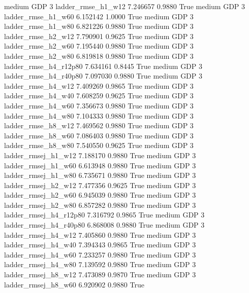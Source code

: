     medium      GDP                 3     ladder_rmse_h1_w12   7.246657      0.9880    True
    medium      GDP                 3     ladder_rmse_h1_w60   6.152142      1.0000    True
    medium      GDP                 3     ladder_rmse_h1_w80   6.821226      0.9880    True
    medium      GDP                 3     ladder_rmse_h2_w12   7.790901      0.9625    True
    medium      GDP                 3     ladder_rmse_h2_w60   7.195440      0.9880    True
    medium      GDP                 3     ladder_rmse_h2_w80   6.819818      0.9880    True
    medium      GDP                 3  ladder_rmse_h4_r12p80   7.634161      0.8445    True
    medium      GDP                 3  ladder_rmse_h4_r40p80   7.097030      0.9880    True
    medium      GDP                 3     ladder_rmse_h4_w12   7.409269      0.9865    True
    medium      GDP                 3     ladder_rmse_h4_w40   7.608259      0.9625    True
    medium      GDP                 3     ladder_rmse_h4_w60   7.356673      0.9880    True
    medium      GDP                 3     ladder_rmse_h4_w80   7.104333      0.9880    True
    medium      GDP                 3     ladder_rmse_h8_w12   7.469562      0.9880    True
    medium      GDP                 3     ladder_rmse_h8_w60   7.086403      0.9880    True
    medium      GDP                 3     ladder_rmse_h8_w80   7.540550      0.9625    True
    medium      GDP                 3    ladder_rmsej_h1_w12   7.188170      0.9880    True
    medium      GDP                 3    ladder_rmsej_h1_w60   6.613948      0.9880    True
    medium      GDP                 3    ladder_rmsej_h1_w80   6.735671      0.9880    True
    medium      GDP                 3    ladder_rmsej_h2_w12   7.477356      0.9625    True
    medium      GDP                 3    ladder_rmsej_h2_w60   6.945039      0.9880    True
    medium      GDP                 3    ladder_rmsej_h2_w80   6.857282      0.9880    True
    medium      GDP                 3 ladder_rmsej_h4_r12p80   7.316792      0.9865    True
    medium      GDP                 3 ladder_rmsej_h4_r40p80   6.868008      0.9880    True
    medium      GDP                 3    ladder_rmsej_h4_w12   7.405860      0.9880    True
    medium      GDP                 3    ladder_rmsej_h4_w40   7.394343      0.9865    True
    medium      GDP                 3    ladder_rmsej_h4_w60   7.233257      0.9880    True
    medium      GDP                 3    ladder_rmsej_h4_w80   7.139592      0.9880    True
    medium      GDP                 3    ladder_rmsej_h8_w12   7.473089      0.9870    True
    medium      GDP                 3    ladder_rmsej_h8_w60   6.920902      0.9880    True
